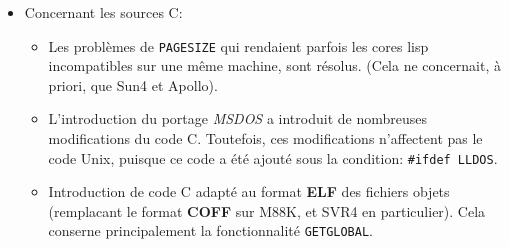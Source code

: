 \begin {itemize}
\begin{itemize}
\item {\bf product}\\
Une d\'{e}finition de {\tt macro-open} manquait, et faisait que ce module
ne fonctionnait pas en compil\'{e}. De plus ce module est pass\'{e} de {\tt
llub} en {\tt llib}.

\item {\bf cpmac}\\
Le fait de recharger le module {\bf cpmac}
introduisait des erreurs de compilation, dues au {\tt CPENV} qui
\'{e}tait \'{e}cras\'{e}. C'est r\'{e}par\'{e}.

\item {\bf complice}\\
Lorsqu'un module import\'{e} {\tt M}, exporte une macro qui n'est pas
dans un EVAL-WHEN, alors ce module doit \^{e}tre charg\'{e} (LOADMODULE)
dans l'environnement de la compilation du module qui importe {\tt M}.
Ce chargement \'{e}tait jusqu'alors fait au moyen de la forme: {\tt
(loadmodule M t)}. le {\tt T} en second argument de LOADMODULE
imposait le {\bf re}chargement de tout l'arbre de d\'{e}pendance de {\tt M}. On
utilise maintenant la forme: {\tt (loadmodule M ())} afin d'all\'{e}ger
l'environnement de compilation.

\item {\bf Bitmap Virtuel}\\
Introduction de la gestion des \'{e}crans 24 plans.
Introduction des {\it stipples}. Ainsi que quelques corrections
mineures. Tous les fichiers {\tt .c} sont concern\'{e}s, seuls quelques
fichiers {\tt .ll} ont \'{e}t\'{e} modifi\'{e}s ({\tt x11init, x11graph,
x11window, x11bitmap, x11draw, x11\_def}).
\end{itemize}

\item Concernant les sources C:
\begin{itemize}
\item Les probl\`{e}mes de {\tt PAGESIZE} qui rendaient parfois les
cores lisp incompatibles sur une m\^{e}me machine, sont r\'{e}solus. (Cela ne
concernait, \`{a} priori, que Sun4 et Apollo).

\item L'introduction du portage {\it MSDOS} a introduit de nombreuses
modifications du code C. Toutefois, ces modifications n'affectent pas 
le code Unix, puisque ce code a \'{e}t\'{e} ajout\'{e} sous
la condition: {\tt \#ifdef LLDOS}.

\item Introduction de code C adapt\'{e} au format {\bf ELF} des fichiers objets
(remplacant le format {\bf COFF} sur M88K, et SVR4 en particulier). Cela
conserne principalement la fonctionnalit\'{e} {\tt GETGLOBAL}.


\end{itemize}
\end{itemize}
